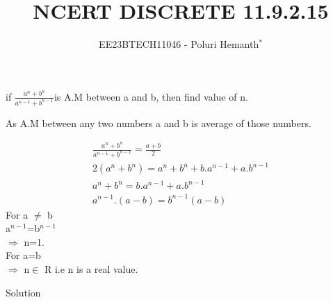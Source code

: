\documentclass[journal,12pt,twocolumn]{IEEEtran}
\theoremstyle{remark}
\begin{document}

\vspace{3cm}


\title{NCERT DISCRETE 11.9.2.15}
\author{EE23BTECH11046 - Poluri Hemanth$^{*}$}



if \( \frac{a^n +b^n}{a^{n-1} + b^{n-1}}\)is A.M between a and b, then find value of n.
\break

 As A.M between any two numbers a and b is average of those  numbers.
 
 \begin{align}
      \frac{a^n +b^n}{a^{n-1} + b^{n-1}}= \frac{a+b}{2}  \\
      2(a^n +b^n) = a^n +b^n +b.a^{n-1}+a.b^{n-1} \\
      a^n +b^n = b.a^{n-1}+a.b^{n-1} \\
      a^{n-1}.(a-b)=b^{n-1}(a-b)
 \end{align}
 For a $\neq$ b \\
 a$^{n-1}$=b$^{n-1}$ \\
 $\Rightarrow$ n=1.\\
  For a=b\\
$\Rightarrow$ n$\in$ R  i.e n is a real value.\newline
\begin{table}[h!]
    
    \caption{Solution}
    \label{tab:11.9.2.15}
\end{table}
\end{document}

